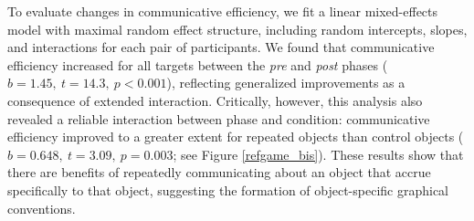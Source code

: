 \documentclass[10pt,letterpaper]{article}
\begin{document}

To evaluate changes in communicative efficiency, we fit a linear mixed-effects model with maximal random effect structure, including random intercepts, slopes, and interactions for each pair of participants.
We found that communicative efficiency increased for all targets between the \textit{pre} and \textit{post} phases ($b = 1.45,~t = 14.3,~p <0.001$), reflecting generalized improvements as a consequence of extended interaction.
Critically, however, this analysis also revealed a reliable interaction between phase and condition: communicative efficiency improved to a greater extent for repeated objects than control objects ($b = 0.648, ~t = 3.09,~p = 0.003$; see Figure \ref{refgame_bis}).
These results show that there are benefits of repeatedly communicating about an object that accrue specifically to that object, suggesting the formation of object-specific graphical conventions.






\end{document}
